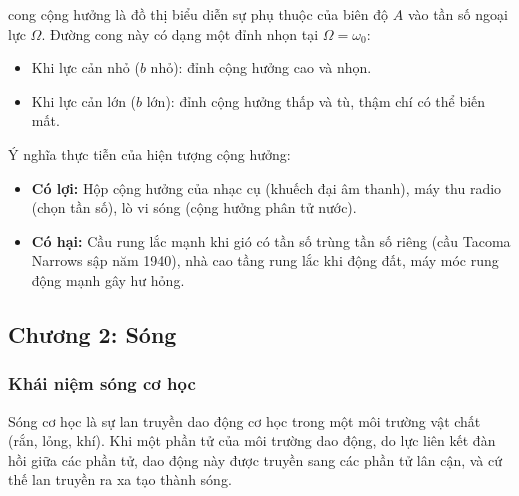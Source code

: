 \begin{enumerate}[label=\alph*)]
    \begin{center}
    \end{center}

     cong cộng hưởng là đồ thị biểu diễn sự phụ thuộc của biên độ $A$ vào tần số ngoại lực $\Omega$. Đường cong này có dạng một đỉnh nhọn tại $\Omega = \omega_0$:
    \begin{itemize}
        \item Khi lực cản nhỏ ($b$ nhỏ): đỉnh cộng hưởng cao và nhọn.
        \item Khi lực cản lớn ($b$ lớn): đỉnh cộng hưởng thấp và tù, thậm chí có thể biến mất.
    \end{itemize}

    Ý nghĩa thực tiễn của hiện tượng cộng hưởng:
    \begin{itemize}
        \item \textbf{Có lợi:} Hộp cộng hưởng của nhạc cụ (khuếch đại âm thanh), máy thu radio (chọn tần số), lò vi sóng (cộng hưởng phân tử nước).
        \item \textbf{Có hại:} Cầu rung lắc mạnh khi gió có tần số trùng tần số riêng (cầu Tacoma Narrows sập năm 1940), nhà cao tầng rung lắc khi động đất, máy móc rung động mạnh gây hư hỏng.
    \end{itemize}
\end{enumerate}

\subsection{Chương 2: Sóng}

\subsubsection{Khái niệm sóng cơ học}

Sóng cơ học là sự lan truyền dao động cơ học trong một môi trường vật chất (rắn, lỏng, khí). Khi một phần tử của môi trường dao động, do lực liên kết đàn hồi giữa các phần tử, dao động này được truyền sang các phần tử lân cận, và cứ thế lan truyền ra xa tạo thành sóng.

